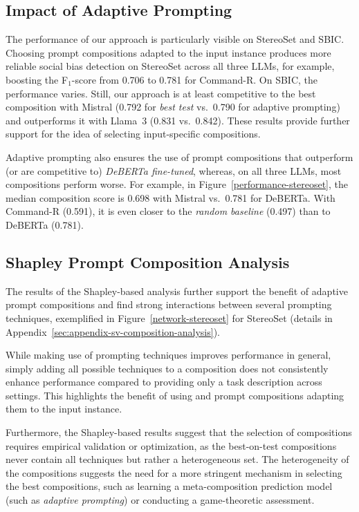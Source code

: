 \subsection{Impact of Adaptive Prompting}

The performance of our approach is particularly visible on StereoSet and SBIC. Choosing prompt compositions adapted to the input instance produces more reliable social bias detection on StereoSet across all three LLMs, for example, boosting the F$_1$-score from 0.706 to 0.781 for Command-R. On SBIC, the performance varies. Still, our approach is at least competitive to the best composition with Mistral (0.792 for \emph{best test} vs.\ 0.790 for adaptive prompting) and outperforms it with Llama~3 (0.831 vs.\ 0.842). These results provide further support for the idea of selecting input-specific compositions.

Adaptive prompting also ensures the use of prompt compositions that outperform (or are competitive to) \emph{DeBERTa fine-tuned}, whereas, on all three LLMs, most compositions perform worse. For example, in Figure~\ref{performance-stereoset}, the median composition score is 0.698 with Mistral vs.\ 0.781 for DeBERTa. With Command-R (0.591), it is even closer to the \emph{random baseline} (0.497) than to DeBERTa (0.781).


\subsection{Shapley Prompt Composition Analysis}

The results of the Shapley-based analysis further support the benefit of adaptive prompt compositions and find strong interactions between several prompting techniques, exemplified in Figure~\ref{network-stereoset} for StereoSet (details in Appendix~\ref{sec:appendix-sv-composition-analysis}).

While making use of prompting techniques improves performance in general, simply adding all possible techniques to a composition does not consistently enhance performance compared to providing only a task description across settings. This highlights the benefit of using and prompt compositions adapting them to the input instance.

Furthermore, the Shapley-based results suggest that the selection of compositions requires empirical validation or optimization, as the best-on-test compositions never contain all techniques but rather a heterogeneous set. The heterogeneity of the compositions suggests the need for a more stringent mechanism in selecting the best compositions, such as learning a meta-composition prediction model (such as \emph{adaptive prompting}) or conducting a game-theoretic assessment.

